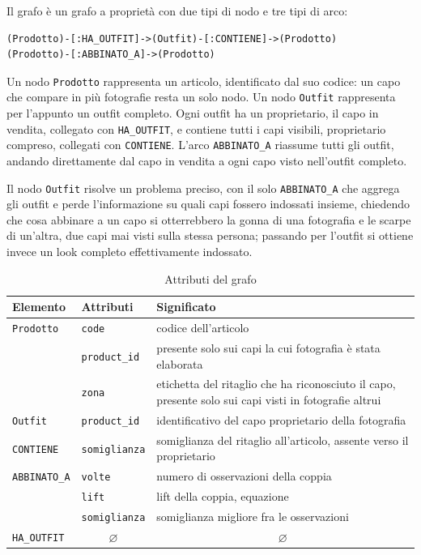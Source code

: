 Il grafo è un grafo a proprietà con due tipi di nodo e tre tipi di arco:
\begin{verbatim}
(Prodotto)-[:HA_OUTFIT]->(Outfit)-[:CONTIENE]->(Prodotto)
(Prodotto)-[:ABBINATO_A]->(Prodotto)
\end{verbatim}

\noindent
Un nodo \texttt{Prodotto} rappresenta un articolo, identificato dal suo codice: un capo che compare in più fotografie resta un solo nodo. Un nodo \texttt{Outfit} rappresenta per l'appunto un outfit completo. Ogni outfit ha un proprietario, il capo in vendita, collegato con \texttt{HA\_OUTFIT}, e contiene tutti i capi visibili, proprietario compreso, collegati con \texttt{CONTIENE}. L'arco \texttt{ABBINATO\_A} riassume tutti gli outfit, andando direttamente dal capo in vendita a ogni capo visto nell'outfit completo.

\noindent
Il nodo \texttt{Outfit} risolve un problema preciso, con il solo \texttt{ABBINATO\_A} che aggrega gli outfit e perde l'informazione su quali capi fossero indossati insieme, chiedendo che cosa abbinare a un capo si otterrebbero la gonna di una fotografia e le scarpe di un'altra, due capi mai visti sulla stessa persona; passando per l'outfit si ottiene invece un look completo effettivamente indossato. \\

\begin{table}[htbp]
    \centering
    \small
    \begin{tabular}{llp{7cm}}
        \hline
            Elemento & Attributi & Significato \\
            \hline
                \texttt{Prodotto}    & \texttt{code}        & codice dell'articolo \\
                & \texttt{product\_id} & presente solo sui capi la cui fotografia è stata elaborata \\
                & \texttt{zona}        & etichetta del ritaglio che ha riconosciuto il capo, presente solo sui capi visti in fotografie altrui \\
                \texttt{Outfit}      & \texttt{product\_id} & identificativo del capo proprietario della fotografia \\
                \texttt{CONTIENE}    & \texttt{somiglianza} & somiglianza del ritaglio all'articolo, assente verso il proprietario \\
                \texttt{ABBINATO\_A} & \texttt{volte}       & numero di osservazioni della coppia \\
                & \texttt{lift}        & lift della coppia, equazione \\
                & \texttt{somiglianza} & somiglianza migliore fra le osservazioni \\
                \texttt{HA\_OUTFIT}  & \multicolumn{1}{c}{$\varnothing$} & \multicolumn{1}{c}{$\varnothing$} \\
        \hline
    \end{tabular}
    \caption{Attributi del grafo}
    \label{tab:pip-proprieta}
\end{table}


